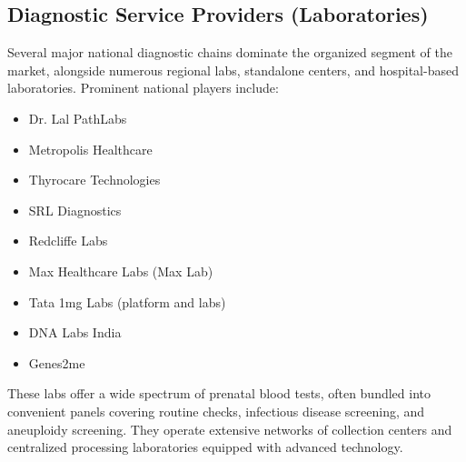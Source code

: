 \documentclass{article}
\begin{document}
\subsection{Diagnostic Service Providers (Laboratories)}
Several major national diagnostic chains dominate the organized segment of the market, alongside numerous regional labs, standalone centers, and hospital-based laboratories. Prominent national players include:
\begin{itemize}
    \item Dr. Lal PathLabs
    \item Metropolis Healthcare
    \item Thyrocare Technologies
    \item SRL Diagnostics
    \item Redcliffe Labs
    \item Max Healthcare Labs (Max Lab)
    \item Tata 1mg Labs (platform and labs)
    \item DNA Labs India
    \item Genes2me
\end{itemize}
These labs offer a wide spectrum of prenatal blood tests, often bundled into convenient panels covering routine checks, infectious disease screening, and aneuploidy screening. They operate extensive networks of collection centers and centralized processing laboratories equipped with advanced technology.
\end{document}
